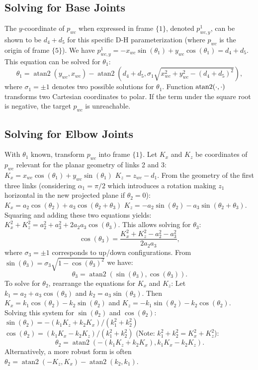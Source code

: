 \documentclass{article}
\newcommand{\st}[1]{\sin(\theta_{#1})}
\newcommand{\ct}[1]{\cos(\theta_{#1})}
\newcommand{\stt}[2]{\sin(\theta_{#1}+\theta_{#2})}
\newcommand{\ctt}[2]{\cos(\theta_{#1}+\theta_{#2})}
\newcommand{\atan}[2]{\operatorname{atan2}(#1, #2)}
\begin{document}
\subsection{Solving for Base Joints}
The $y$-coordinate of $p_{wc}$ when expressed in frame $\{1\}$, denoted $p_{wc,y}^1$, can be shown to be $d_4+d_5$ for this specific D-H parameterization (where $p_{wc}$ is the origin of frame $\{5\}$).
We have $p_{wc,y}^1 = -x_{wc} \st{1} + y_{wc} \ct{1} = d_4+d_5$.
This equation can be solved for $\theta_1$:
\begin{equation}
\theta_1 = \atan{y_{wc}}{x_{wc}} - \atan{d_4+d_5}{\sigma_1 \sqrt{x_{wc}^2 + y_{wc}^2 - (d_4+d_5)^2}},
\end{equation}
where $\sigma_1 = \pm 1$ denotes two possible solutions for $\theta_1$. 
Function $\rm{atan2}(\cdot,\cdot)$ transforms
two Cartesian coordinates
to polar.
If the term under the square root is negative, the target $p_{wc}$ is unreachable.

\subsection{Solving for Elbow Joints}
With $\theta_1$ known, transform $p_{wc}$ into frame $\{1\}$. Let $K_x$ and $K_z$ be coordinates of $p_{wc}$ relevant for the planar geometry of links 2 and 3:
$K_x = x_{wc} \ct{1} + y_{wc} \st{1}$
$K_z = z_{wc} - d_1$. From the geometry of the first three links (considering $\alpha_1=\pi/2$ which introduces a rotation making $z_1$ horizontal in the new projected plane if $\theta_2=0$):
$K_x = a_2 \ct{2} + a_3 \ctt{2}{3}$
$K_z = -a_2 \st{2} - a_3 \stt{2}{3}$. Squaring and adding these two equations yields:
$K_x^2 + K_z^2 = a_2^2 + a_3^2 + 2 a_2 a_3 \ct{3}$. This allows solving for $\theta_3$:
\begin{equation}
\ct{3} = \frac{K_x^2 + K_z^2 - a_2^2 - a_3^2}{2 a_2 a_3},
\end{equation}
where $\sigma_3 = \pm 1$ corresponds to up/down configurations. From $\st{3} = \sigma_3 \sqrt{1-\ct{3}^2}$ we have:
\begin{equation}
    \theta_3 = \atan{\st{3}}{\ct{3}}.
\end{equation}
To solve for $\theta_2$, rearrange the equations for $K_x$ and $K_z$:
Let $k_1 = a_2 + a_3\ct{3}$ and $k_2 = a_3\st{3}$.
Then $K_x = k_1 \ct{2} - k_2 \st{2}$ and $K_z = -k_1 \st{2} - k_2 \ct{2}$. 
Solving this system for $\st{2}$ and $\ct{2}$:
$\st{2} = -(k_1 K_z + k_2 K_x) / (k_1^2+k_2^2)$
$\ct{2} = (k_1 K_x - k_2 K_z) / (k_1^2+k_2^2)$ (Note: $k_1^2+k_2^2 = K_x^2+K_z^2$):
\begin{equation}
    \theta_2 = \atan{-(k_1 K_z + k_2 K_x)}{k_1 K_x - k_2 K_z}.
\end{equation}
Alternatively, a more robust form is often $\theta_2 = \atan{-K_z}{K_x} - \atan{k_2}{k_1}$.
\end{document}

